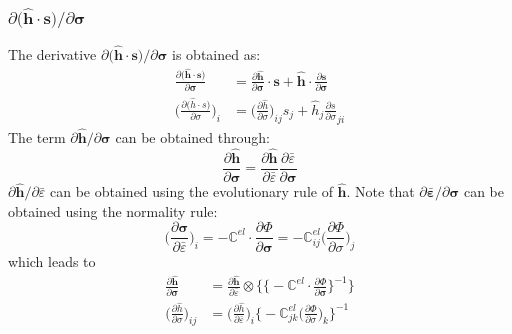 \documentclass[12pt]{amsart}
\begin{document}
\subsubsection{$\partial\big(\hat{\mathbf{h}}\cdot\mathbf{s}\big)/ \partial\mathbf{\sigma}$ }
\label{sec:3.2.1}
The derivative  $\partial\big(\hat{\mathbf{h}}\cdot\mathbf{s}\big)/ \partial\mathbf{\sigma}$ is obtained as:
\begin{equation}
  \begin{split}
    \label{eq:dphib3}
    \frac{\partial \big(\hat{\mathbf{h}}\cdot\mathbf{s} \big)  } {\partial\mathbf{\sigma}} &= \frac{\partial \hat{\mathbf{h}}}{\partial\mathbf{\sigma}}\cdot\mathbf{s} +\hat{\mathbf{h}}\cdot\frac{\partial \mathbf{s}}{\partial\mathbf{\sigma}}\\
    \bigg(\frac{\partial \big(\hat{h}\cdot s\big)} {\partial\sigma}\bigg)_i &= \bigg(\frac{\partial\hat{h}}{\partial \sigma}\bigg)_{ij} s_j +\hat{h}_j\frac{\partial s}{\partial\sigma}_{ji}
  \end{split}
\end{equation}
The term $ \partial\hat{\mathbf{h}}/ \partial\mathbf{\sigma} $ can be obtained through:
\begin{equation}
  \label{eq:dphib4}
\frac{\partial\hat{\mathbf{h}}}{\partial\mathbf{\sigma}}=\frac{\partial{\hat{\mathbf{h}}}}{\partial{\bar{\varepsilon}}}   \frac{\partial{\bar{\varepsilon}}}{\partial{\mathbf{\sigma}}}
\end{equation}
$\partial\hat{\mathbf{h}}/\partial\bar{\varepsilon} $ can be obtained using the evolutionary rule of $\hat{\mathbf{h}}$.
Note that $\partial\bar{\mathbf{\varepsilon}}/\partial\mathbf{\sigma}$ can be obtained using the normality rule:
\begin{equation}
  \label{eq:dphib5}
  \bigg(\frac{\partial{\mathbf{\sigma}}}{\partial{\bar{\varepsilon}}}\bigg)_i = - \mathbb{C}^{el} \cdot \frac{\partial\Phi}{\partial{\mathbf{\sigma}}} = -\mathbb{C}^{el}_{ij} \bigg(\frac{\partial\Phi}{\partial\sigma}\bigg)_j
\end{equation}
which leads to
\begin{equation}
  \label{eq:dphib6}
  \begin{split}
      \frac{\partial\hat{\mathbf{h}}}{\partial\mathbf{\sigma}} &=\frac{\partial\hat{\mathbf{h}}}{\partial\bar{\varepsilon}}\otimes \bigg\{ \Big\{- \mathbb{C}^{el} \cdot \frac{\partial\Phi}{\partial\mathbf{\sigma}}\Big\}^{-1} \bigg\}\\
    \bigg(\frac{\partial\hat{h}}{\partial \sigma}\bigg)_{ij}&=\bigg(\frac{\partial\hat{h}}{\partial\bar{\varepsilon}}\bigg)_i \bigg\{-\mathbb{C}^{el}_{jk} \Big(\frac{\partial\Phi}{\partial\sigma}\Big)_{k}\bigg\}^{-1}
  \end{split}
\end{equation}
\end{document}
